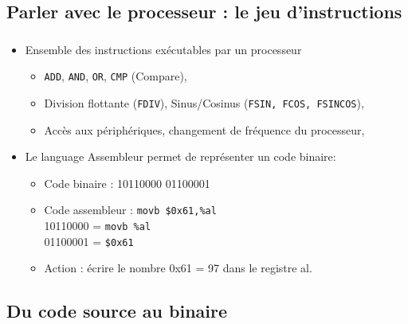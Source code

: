 \subsection{Parler avec le processeur : le jeu d'instructions}

\begin{frame}[fragile]
\frametitle{\insertsubsection}
\begin{itemize}
  \item Ensemble des instructions exécutables par un processeur
    \begin{itemize}
    \item \texttt{ADD}, \texttt{AND}, \texttt{OR}, \texttt{CMP} (Compare),\…
     \item Division flottante (\texttt{FDIV}), Sinus/Cosinus (\texttt{FSIN, FCOS, FSINCOS}),\…
     \item Accès aux périphériques, changement de fréquence du processeur,\…
    \end{itemize}
  \item Le language Assembleur permet de représenter un code binaire:
    \begin{itemize}
      \item Code binaire : 10110000 01100001
      \item Code assembleur : \texttt{movb \$0x61,\%al}\\
            10110000 = \texttt{movb \%al}\\
            01100001 = \texttt{\$0x61}
      \item Action : écrire le nombre 0x61 = 97 dans le registre al.
    \end{itemize}
\end{itemize}
\end{frame}

\subsection{Du code source au binaire}

